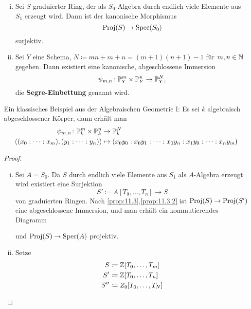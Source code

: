 \begin{kor}
  \label{kor:11.4}
  \begin{enumerate}[i)]
  \item\label{kor:11.4.1} Sei $S$ graduierter Ring, der als $S_0$-Algebra durch endlich viele Elemente aus $S_1$ erzeugt wird. Dann ist der kanonische Morphismus
    \[
    \Proj(S) \to \Spec(S_0)
    \]
    surjektiv.
  \item\label{kor:11.4.2} Sei $Y$ eine Schema, $N \coloneqq mn + m + n = (m+1)(n+1)-1$ für $m,n \in \N$ gegeben. Dann existiert eine kanonische, abgeschlossene Immersion
    \[
    \psi_{m,n} \colon \P_Y^m \times \P_Y^n \to \P_Y^N,
    \]
    die \textbf{Segre-Einbettung} genannt wird.
  \end{enumerate}
  \begin{bsp*} Ein klassisches Beispiel aus der Algebraischen Geometrie I: Es sei $k$ algebraisch abgeschlossener Körper, dann erhält man
    \begin{align*}
      \psi_{m,n} \colon \P_k^m \times \P_k^n &\to \P_k^N \\
      ((x_0 : \dotsm : x_m),(y_1:\dotsm:y_n)) &\mapsto (x_0 y_0 : x_0 y_1 : \dotsm : x_0 y_n: x_1 y_0 : \dotsm : x_n y_m)
    \end{align*}    
  \end{bsp*}
  \begin{proof}
    \begin{enumerate}[i)]
    \item Sei $A =S_0$. Da $S$ durch endlich viele Elemente aus $S_1$ als $A$-Algebra erzeugt wird existiert eine Surjektion
      \[
      S' \coloneq A[T_0,\dotsc,T_n] \to S
      \]
      von graduierten Ringen. Nach \ref{prop:11.3},\ref{prop:11.3.2} ist $\Proj(S) \to \Proj(S')$ eine abgeschlossene Immersion, und man erhält ein kommutierendes Diagramm
      \begin{center}
      \end{center}
      und $\Proj(S) \to \Spec(A)$ projektiv.
    \item
      Setze 
      \begin{align*}
        S &\coloneqq \Z[T_0,\dotsc,T_m]\\
        S' &\coloneqq \Z[T_0,\dotsc, T_n]\\
        S'' &\coloneqq Z_0 [ T_0,\dotsc,T_N ]\\

\end{align*}
\end{enumerate}
\end{proof}
\end{kor}
